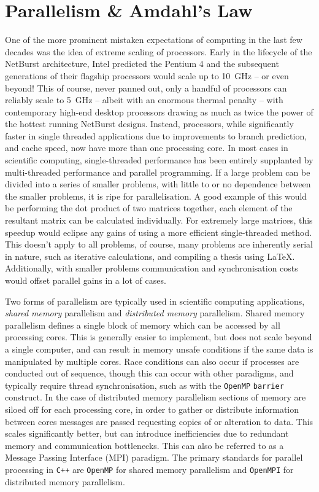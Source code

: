 \section{Parallelism \& Amdahl's Law}
\label{app:parallelism}

One of the more prominent mistaken expectations of computing in the last few decades was the idea of extreme scaling of processors.
Early in the lifecycle of the NetBurst architecture, Intel predicted the Pentium 4 and the subsequent generations of their flagship processors would scale up to \SI{10}{\giga\hertz} -- or even beyond!
This of course, never panned out, only a handful of processors can reliably scale to \SI{5}{\giga\hertz} -- albeit with an enormous thermal penalty -- with contemporary high-end desktop processors drawing as much as twice the power of the hottest running NetBurst designs.
Instead, processors, while significantly faster in single threaded applications due to improvements to branch prediction, and cache speed, now have more than one processing core.
In most cases in scientific computing, single-threaded performance has been entirely supplanted by multi-threaded performance and parallel programming.
If a large problem can be divided into a series of smaller problems, with little to or no dependence between the smaller problems, it is ripe for parallelisation.
A good example of this would be performing the dot product of two matrices together, each element of the resultant matrix can be calculated individually.
For extremely large matrices, this speedup would eclipse any gains of using a more efficient single-threaded method.
This doesn't apply to all problems, of course, many problems are inherently serial in nature, such as iterative calculations, and compiling a thesis using \LaTeX.
Additionally, with smaller problems communication and synchronisation costs would offset parallel gains in a lot of cases.

Two forms of parallelism are typically used in scientific computing applications, \emph{shared memory} parallelism and \emph{distributed memory} parallelism.
Shared memory parallelism defines a single block of memory which can be accessed by all processing cores.
This is generally easier to implement, but does not scale beyond a single computer, and can result in memory unsafe conditions if the same data is manipulated by multiple cores.
Race conditions can also occur if processes are conducted out of sequence, though this can occur with other paradigms, and typically require thread synchronisation, such as with the \texttt{OpenMP} \texttt{barrier} construct.
In the case of distributed memory parallelism sections of memory are siloed off for each processing core, in order to gather or distribute information between cores messages are passed requesting copies of or alteration to data.
This scales significantly better, but can introduce inefficiencies due to redundant memory and communication bottlenecks.
This can also be referred to as a Message Passing Interface (MPI) paradigm.
The primary standards for parallel processing in \texttt{C++} are \texttt{OpenMP} for shared memory parallelism and \texttt{OpenMPI} for distributed memory parallelism.

